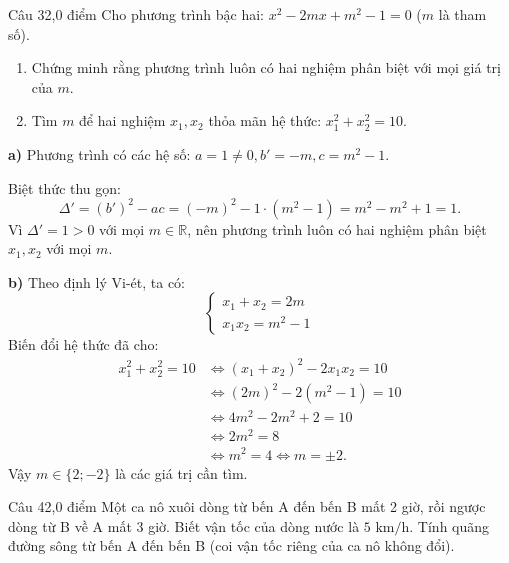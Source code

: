 \begin{de_cau}{Câu 3}{2,0 điểm}
Cho phương trình bậc hai: $x^2 - 2mx + m^2 - 1 = 0$ ($m$ là tham số).
\begin{enumerate}[label=\alph*)]
  \item Chứng minh rằng phương trình luôn có hai nghiệm phân biệt với mọi giá trị của $m$.
  \item Tìm $m$ để hai nghiệm $x_1, x_2$ thỏa mãn hệ thức: $x_1^2 + x_2^2 = 10$.
\end{enumerate}
\end{de_cau}

\begin{loi_giai_cau}
\textbf{a)} Phương trình có các hệ số: $a = 1 \neq 0, b' = -m, c = m^2 - 1$.

Biệt thức thu gọn:
\[\Delta' = (b')^2 - ac = (-m)^2 - 1\cdot(m^2 - 1) = m^2 - m^2 + 1 = 1.\]
Vì $\Delta' = 1 > 0$ với mọi $m \in \mathbb{R}$, nên phương trình luôn có hai nghiệm phân biệt $x_1, x_2$ với mọi $m$.

\textbf{b)} Theo định lý Vi-ét, ta có:
\[\begin{cases} x_1 + x_2 = 2m \\ x_1 x_2 = m^2 - 1 \end{cases}\]
Biến đổi hệ thức đã cho:
\begin{align*}
x_1^2 + x_2^2 = 10 &\Leftrightarrow (x_1 + x_2)^2 - 2x_1 x_2 = 10 \\
&\Leftrightarrow (2m)^2 - 2(m^2 - 1) = 10 \\
&\Leftrightarrow 4m^2 - 2m^2 + 2 = 10 \\
&\Leftrightarrow 2m^2 = 8 \\
&\Leftrightarrow m^2 = 4 \Leftrightarrow \boxed{m = \pm 2}.
\end{align*}
Vậy $m \in \{2; -2\}$ là các giá trị cần tìm.
\end{loi_giai_cau}

\begin{de_cau}{Câu 4}{2,0 điểm}
Một ca nô xuôi dòng từ bến A đến bến B mất 2 giờ, rồi ngược dòng từ B về A mất 3 giờ. Biết vận tốc của dòng nước là $5\text{ km/h}$. Tính quãng đường sông từ bến A đến bến B (coi vận tốc riêng của ca nô không đổi).
\end{de_cau}

